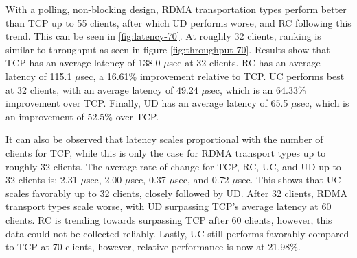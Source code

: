With a polling, non-blocking design, RDMA transportation types perform better than TCP up to 55 clients, after which UD performs worse, and RC following this trend. This can be seen in \ref{fig:latency-70}.
At roughly 32 clients, ranking is similar to throughput as seen in figure \ref{fig:throughput-70}.
Results show that TCP has an average latency of 138.0 $\mu$sec at 32 clients.
RC has an average latency of 115.1 $\mu$sec, a 16.61\% improvement relative to TCP.
UC performs best at 32 clients, with an average latency of 49.24 $\mu$sec, which is an 64.33\% improvement over TCP.
Finally, UD has an average latency of 65.5 $\mu$sec, which is an improvement of 52.5\% over TCP.

It can also be observed that latency scales proportional with the number of clients for TCP, while this is only the case for RDMA transport types up to roughly 32 clients.
The average rate of change for TCP, RC, UC, and UD up to 32 clients is: 2.31 $\mu$sec, 2.00 $\mu$sec, 0.37 $\mu$sec, and 0.72 $\mu$sec.
This shows that UC scales favorably up to 32 clients, closely followed by UD.
After 32 clients, RDMA transport types scale worse, with UD surpassing TCP's average latency at 60 clients.
RC is trending towards surpassing TCP after 60 clients, however, this data could not be collected reliably.
Lastly, UC still performs favorably compared to TCP at 70 clients, however, relative performance is now at 21.98\%.

